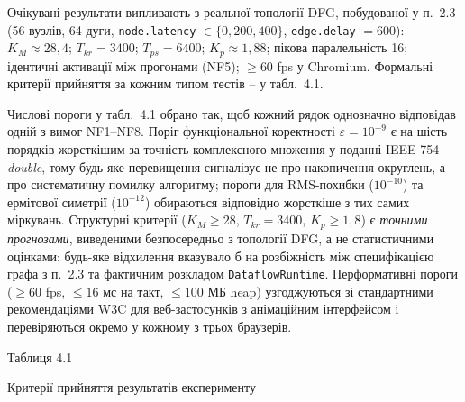 \documentclass[
]{article}
\newcommand{\passthrough}[1]{#1}
\begin{document}
Очікувані результати випливають з реальної топології DFG, побудованої у
п.~2.3 (56 вузлів, 64 дуги, \passthrough{\lstinline!node.latency!}
\(\in \{ 0,200,400\}\), \passthrough{\lstinline!edge.delay!} \(= 600\)):
\(K_{M} \approx 28,4\); \(T_{kr} = 3400\); \(T_{ps} = 6400\);
\(K_{p} \approx 1,88\); пікова паралельність 16; ідентичні активації між
прогонами (NF5); \(\geq 60\) fps у Chromium. Формальні критерії
прийняття за кожним типом тестів -- у табл.~4.1.

Числові пороги у табл.~4.1 обрано так, щоб кожний рядок однозначно
відповідав одній з вимог NF1--NF8. Поріг функціональної коректності
\(\varepsilon = 10^{- 9}\) є на шість порядків жорсткішим за точність
комплексного множення у поданні IEEE-754 \emph{double}, тому будь-яке
перевищення сигналізує не про накопичення округлень, а про
систематичну помилку алгоритму; пороги для RMS-похибки
(\(10^{- 10}\)) та ермітової симетрії (\(10^{- 12}\)) обираються
відповідно жорсткіше з тих самих міркувань. Структурні критерії
(\(K_{M} \geq 28\), \(T_{kr} = 3400\), \(K_{p} \geq 1,8\)) є
\emph{точними прогнозами}, виведеними безпосередньо з топології DFG, а
не статистичними оцінками: будь-яке відхилення вказувало б на
розбіжність між специфікацією графа з п.~2.3 та фактичним розкладом
\passthrough{\lstinline!DataflowRuntime!}. Перформативні пороги
(\(\geq 60\) fps, \(\leq 16\) мс на такт, \(\leq 100\) МБ heap)
узгоджуються зі стандартними рекомендаціями W3C для веб-застосунків з
анімаційним інтерфейсом і перевіряються окремо у кожному з трьох
браузерів.

Таблиця 4.1

Критерії прийняття результатів експерименту
\end{document}
